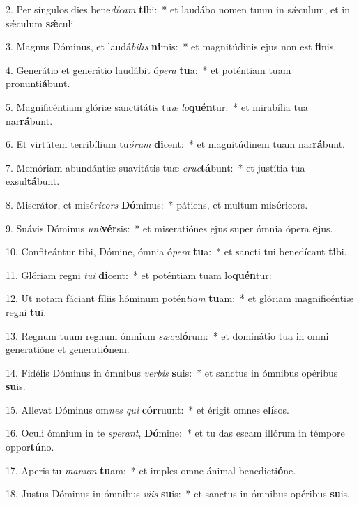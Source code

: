 2. Per síngulos dies bene\textit{dí}\textit{cam} \textbf{ti}bi:~*  et laudábo nomen tuum in sǽculum, et in sǽculum \textbf{sǽ}culi.\

3. Magnus Dóminus, et laudá\textit{bi}\textit{lis} \textbf{ni}mis:~*  et magnitúdinis ejus non est \textbf{fi}nis.\

4. Generátio et generátio laudábit ó\textit{pe}\textit{ra} \textbf{tu}a:~*  et poténtiam tuam pronunti\textbf{á}bunt.\

5. Magnificéntiam glóriæ sanctitátis tu\textit{æ} \textit{lo}\textbf{quén}tur:~*  et mirabília tua nar\textbf{rá}bunt.\

6. Et virtútem terribílium tu\textit{ó}\textit{rum} \textbf{di}cent:~*  et magnitúdinem tuam nar\textbf{rá}bunt.\

7. Memóriam abundántiæ suavitátis tuæ \textit{e}\textit{ruc}\textbf{tá}bunt:~*  et justítia tua exsul\textbf{tá}bunt.\

8. Miserátor, et misé\textit{ri}\textit{cors} \textbf{Dó}minus:~*  pátiens, et multum mi\textbf{sé}ricors.\

9. Suávis Dóminus \textit{u}\textit{ni}\textbf{vér}sis:~*  et miseratiónes ejus super ómnia ópera \textbf{e}jus.\

10. Confiteántur tibi, Dómine, ómnia ó\textit{pe}\textit{ra} \textbf{tu}a:~*  et sancti tui benedícant \textbf{ti}bi.\

11. Glóriam regni \textit{tu}\textit{i} \textbf{di}cent:~*  et poténtiam tuam lo\textbf{quén}tur:\

12. Ut notam fáciant fíliis hóminum potén\textit{ti}\textit{am} \textbf{tu}am:~*  et glóriam magnificéntiæ regni \textbf{tu}i.\

13. Regnum tuum regnum ómnium \textit{sæ}\textit{cu}\textbf{ló}rum:~*  et dominátio tua in omni generatióne et generati\textbf{ó}nem.\

14. Fidélis Dóminus in ómnibus \textit{ver}\textit{bis} \textbf{su}is:~*  et sanctus in ómnibus opéribus \textbf{su}is.\

15. Allevat Dóminus om\textit{nes} \textit{qui} \textbf{cór}ruunt:~*  et érigit omnes e\textbf{lí}sos.\

16. Oculi ómnium in te \textit{spe}\textit{rant}, \textbf{Dó}mine:~*  et tu das escam illórum in témpore oppor\textbf{tú}no.\

17. Aperis tu \textit{ma}\textit{num} \textbf{tu}am:~*  et imples omne ánimal benedicti\textbf{ó}ne.\

18. Justus Dóminus in ómnibus \textit{vi}\textit{is} \textbf{su}is:~*  et sanctus in ómnibus opéribus \textbf{su}is.\

